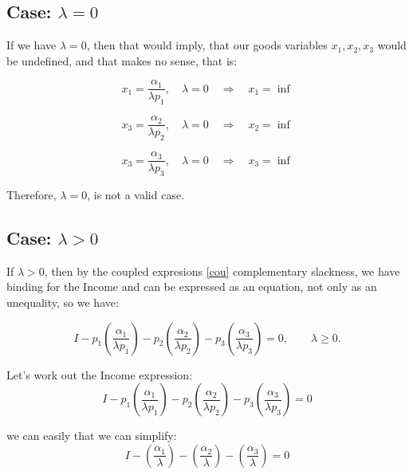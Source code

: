 \documentclass{article}
\begin{document}
\bigskip

\subsection*{Case: $\lambda = 0$}
If we have $\lambda = 0$, then that would imply, that our goods variables $x_1, x_2, x_3 $ would be undefined, and that makes no sense, that is:

\begin{equation}
  x_1 = \frac{\alpha_1}{\lambda p_1}, \quad \lambda = 0 \quad \Rightarrow \quad x_1 = \inf
\end{equation}

\begin{equation}
  x_3 = \frac{\alpha_2}{\lambda p_2}, \quad \lambda = 0 \quad \Rightarrow \quad x_2 = \inf
\end{equation}

\begin{equation}
  x_3 = \frac{\alpha_3}{\lambda p_3}, \quad \lambda = 0 \quad \Rightarrow \quad x_3 = \inf
\end{equation}

Therefore, $\lambda = 0$, is not a valid case.

\subsection*{Case: $\lambda > 0$}
If $\lambda > 0$, then by the coupled expresions \ref{cou} complementary slackness, we have binding for the Income and can be expressed as an equation, not only as an unequality, so we have:

\begin{equation}
   I - p_1 \left( \frac{\alpha_1}{\lambda p_1} \right) - p_2 \left( \frac{\alpha_2}{\lambda p_2} \right) - p_3 \left( \frac{\alpha_3}{\lambda p_3} \right) = 0, \qquad \lambda \geq 0.
\end{equation}

Let's work out the Income expression:
\begin{equation}
   I - p_1 \left( \frac{\alpha_1}{\lambda p_1} \right) - p_2 \left( \frac{\alpha_2}{\lambda p_2} \right) - p_3 \left( \frac{\alpha_3}{\lambda p_3} \right) = 0
\end{equation}

we can easily that we can simplify:
\begin{equation}
   I - \left( \frac{\alpha_1}{\lambda} \right) - \left( \frac{\alpha_2}{\lambda} \right) - \left( \frac{\alpha_3}{\lambda} \right) = 0
\end{equation}
\end{document}
